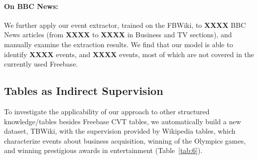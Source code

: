 
\paragraph{On BBC News:}
We further apply our event extractor, trained on the FBWiki,  to \textbf{XXXX} BBC News 
articles (from \textbf{XXXX} to \textbf{XXXX} in Business and TV sections),  and manually examine
the extraction results. We find that our model  is able to identify \textbf{XXXX}  events,  and  \textbf{XXXX}  events, 
most of which are not covered in the currently used Freebase. 



\subsection{Tables as Indirect Supervision}
To investigate the applicability of our approach to other structured knowledge/tables besides Freebase CVT tables, %
we automatically build a new dataset, TBWiki, with the supervision provided by Wikipedia tables, which characterize events about business acquisition, winning of the Olympics games, and winning prestigious awards in entertainment (Table~\ref{tab:6}). 

